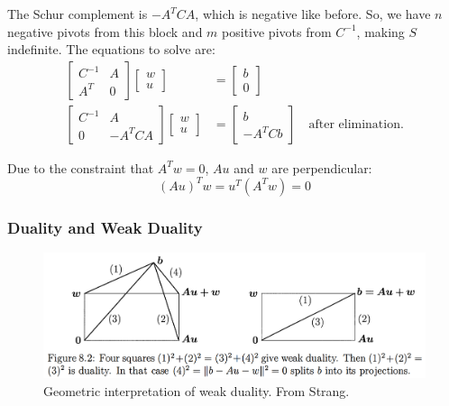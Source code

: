 \documentclass[]{article}
\begin{document}
The Schur complement is $-A^T C A$, which is negative like before. So, we have $n$ negative pivots from this block and $m$ positive pivots from $C^{-1}$, making $S$ indefinite. The equations to solve are:
\begin{align}
\begin{bmatrix} C^{-1} & A \\ A^T & 0 \end{bmatrix} \begin{bmatrix} w \\ u \end{bmatrix} &= \begin{bmatrix} b \\ 0 \end{bmatrix} \\
\begin{bmatrix} C^{-1} & A \\ 0 & -A^T C A \end{bmatrix} \begin{bmatrix} w \\ u \end{bmatrix} &= \begin{bmatrix} b \\ -A^T C b \end{bmatrix} \quad \textrm{after elimination.}
\end{align}

Due to the constraint that $A^T w = 0$, $Au$ and $w$ are perpendicular: 
\begin{equation}
(Au)^T w = u^T (A^T w) = 0
\end{equation}

\subsubsection{Duality and Weak Duality}

\begin{figure}[H]
	\centering
	\includegraphics[width=0.9\linewidth]{figs/Strang_wsq_weakduality}
	\caption{Geometric interpretation of weak duality. From Strang.}
	\label{fig:strangwsqweakduality}
\end{figure}
\end{document}
